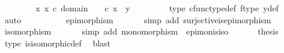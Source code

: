 \begin{isabellebody}
\ \ \ \ \ \isamarkupfalse%
\ \isamarkupfalse%
\ {\isachardoublequoteopen}{\isasymexists}x{\isachardot}{\kern0pt}\ x\ {\isasymin}\isactrlsub c\ domain\ {\isasymphi}\ {\isasymand}\ {\isasymphi}\ {\isasymcirc}\isactrlsub c\ x\ {\isacharequal}{\kern0pt}\ y{\isachardoublequoteclose}\isanewline
\ \ \ \ \ \ \ \isamarkupfalse%
\ {\isasymphi}{\isacharunderscore}{\kern0pt}type\ cfunc{\isacharunderscore}{\kern0pt}type{\isacharunderscore}{\kern0pt}def\ f{\isacharunderscore}{\kern0pt}type\ y{\isacharunderscore}{\kern0pt}def\ \isamarkupfalse%
\ auto\isanewline
\ \ \ \isamarkupfalse%
\isanewline
\ \ \ \isamarkupfalse%
\ \isamarkupfalse%
\ {\isachardoublequoteopen}epimorphism{\isacharparenleft}{\kern0pt}{\isasymphi}{\isacharparenright}{\kern0pt}{\isachardoublequoteclose}\isanewline
\ \ \ \ \ \isamarkupfalse%
\ {\isacharparenleft}{\kern0pt}simp\ add{\isacharcolon}{\kern0pt}\ surjective{\isacharunderscore}{\kern0pt}is{\isacharunderscore}{\kern0pt}epimorphism{\isacharparenright}{\kern0pt}\isanewline
\ \ \ \isamarkupfalse%
\ \isamarkupfalse%
\ {\isachardoublequoteopen}isomorphism{\isacharparenleft}{\kern0pt}{\isasymphi}{\isacharparenright}{\kern0pt}{\isachardoublequoteclose}\isanewline
\ \ \ \ \ \isamarkupfalse%
\ {\isacharparenleft}{\kern0pt}simp\ add{\isacharcolon}{\kern0pt}\ {\isacartoucheopen}monomorphism\ {\isasymphi}{\isacartoucheclose}\ epi{\isacharunderscore}{\kern0pt}mon{\isacharunderscore}{\kern0pt}is{\isacharunderscore}{\kern0pt}iso{\isacharparenright}{\kern0pt}\isanewline
\ \ \ \isamarkupfalse%
\ \isamarkupfalse%
\ {\isacharquery}{\kern0pt}thesis\isanewline
\ \ \ \ \ \isamarkupfalse%
\ {\isasymphi}{\isacharunderscore}{\kern0pt}type\ is{\isacharunderscore}{\kern0pt}isomorphic{\isacharunderscore}{\kern0pt}def\ \isamarkupfalse%
\ blast\isanewline
{}\isamarkupfalse%
%
\endisatagproof
{\isafoldproof}%
%
\isadelimproof
\isanewline
%
\endisadelimproof
%
\isadelimtheory
\isanewline
%
\endisadelimtheory
%
\isatagtheory
{}\isamarkupfalse%
%
\endisatagtheory
{\isafoldtheory}%
%
\isadelimtheory
%
\endisadelimtheory
%
\end{isabellebody}%
\endinput
